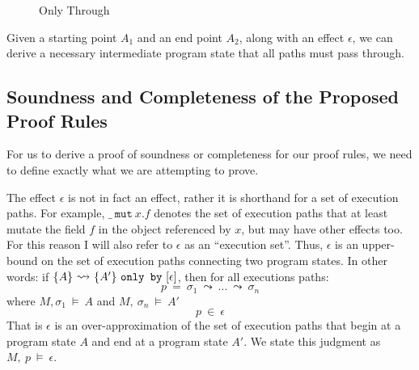 \documentclass[12pt]{article}
\newcommand\trans[1]{\overset{#1}{\mathlarger{\mathlarger \leadsto}}}
\newcommand\mut[3]{#1\ \texttt{mut}\ #2.#3}
\newcommand\onlyBy[3]{\{#1\}\ \trans{}\ \{#2\}\ \texttt{only by}\ [#3]}
\newcommand\onlyThrough[3]{\{#1\}\ \trans{}\ \{#2\}\ \texttt{only through}\ [#3]}
\begin{document}
\begin{figure}[p]
\caption{Only Through}
\label{f:only_through}
\end{figure}
Given a starting point $A_1$ and an end point $A_2$, along with an effect $\epsilon$, we can derive a necessary intermediate program state
that all paths must pass through.

\subsection{Soundness and Completeness of the Proposed Proof Rules}
For us to derive a proof of soundness or completeness for our proof rules, 
we need to define exactly what we are attempting to prove.

The effect $\epsilon$ is not in fact an effect, rather it is shorthand for a set of execution paths.
For example, $\mut{\_}{x}{f}$ denotes the set of execution paths that 
at least mutate the field $f$ in the object referenced by $x$, but may 
have other effects too. For this reason I will also refer to $\epsilon$ 
as an ``execution set''.
Thus, $\epsilon$ is an upper-bound on the set of execution paths
connecting two program states.
In other words: if $\onlyBy{A}{A'}{\epsilon}$, then for all
executions paths:
$$p\ =\ \sigma_1\ \leadsto\ \ldots\ \leadsto\ \sigma_n$$
where $M, \sigma_1\ \vDash\ A$ and $M,\ \sigma_n\ \vDash\ A'$
$$p\ \in\ \epsilon$$
That is $\epsilon$ is an over-approximation of the set of execution
paths that begin at a program state $A$ and end at a program state
$A'$. We state this judgment as $M,\ p\ \vDash\ \epsilon$.
\end{document}
